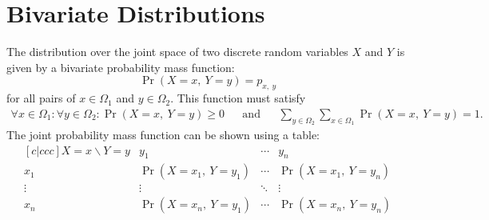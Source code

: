 \documentclass{article}
\begin{document}
\section{Bivariate Distributions}
\begin{definition}
    The distribution over the joint space of two discrete random variables \(X\) and \(Y\) is given by a bivariate probability mass function:
    \begin{equation*}
        \Pr{\left( X = x,\: Y = y \right)} = p_{x,\: y}
    \end{equation*}
    for all pairs of \(x \in \Omega_1\) and \(y \in \Omega_2\). This function must satisfy
    \begin{align*}
        \forall x \in \Omega_1 : \forall y \in \Omega_2 : \Pr{\left( X = x,\: Y = y \right)} \geq 0 &  & \text{and} &  &
        \sum_{y \in \Omega_2} \sum_{x \in \Omega_1} \Pr{\left( X = x,\: Y = y \right)} = 1.
    \end{align*}
    The joint probability mass function can be shown using a table:
    \begin{equation*}
        \begin{matrix}[c|ccc]
            X=x \backslash Y=y & y_1                                    & \cdots & y_n                                    \\
            \hline
            x_1                & \Pr{\left( X = x_1,\: Y = y_1 \right)} & \cdots & \Pr{\left( X = x_1,\: Y = y_n \right)} \\
            \vdots             & \vdots                                 & \ddots & \vdots                                 \\
            x_n                & \Pr{\left( X = x_n,\: Y = y_1 \right)} & \cdots & \Pr{\left( X = x_n,\: Y = y_n \right)}
        \end{matrix}
    \end{equation*}
\end{definition}
\end{document}
